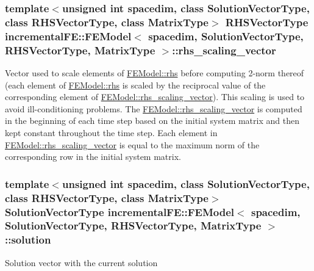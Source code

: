 \subsubsection[{\texorpdfstring{rhs\+\_\+scaling\+\_\+vector}{rhs_scaling_vector}}]{\setlength{\rightskip}{0pt plus 5cm}template$<$unsigned int spacedim, class Solution\+Vector\+Type, class R\+H\+S\+Vector\+Type, class Matrix\+Type$>$ R\+H\+S\+Vector\+Type {\bf incremental\+F\+E\+::\+F\+E\+Model}$<$ spacedim, Solution\+Vector\+Type, R\+H\+S\+Vector\+Type, Matrix\+Type $>$\+::rhs\+\_\+scaling\+\_\+vector\hspace{0.3cm}{\ttfamily [private]}}\hypertarget{classincremental_f_e_1_1_f_e_model_a26ffe7f5ecf94f3bdbe27f4ea3e577dc}{}\label{classincremental_f_e_1_1_f_e_model_a26ffe7f5ecf94f3bdbe27f4ea3e577dc}
Vector used to scale elements of \hyperlink{classincremental_f_e_1_1_f_e_model_aba8e9e925aa72d2dd0f86c451b2cf3d6}{F\+E\+Model\+::rhs} before computing 2-\/norm thereof (each element of \hyperlink{classincremental_f_e_1_1_f_e_model_aba8e9e925aa72d2dd0f86c451b2cf3d6}{F\+E\+Model\+::rhs} is scaled by the reciprocal value of the corresponding element of \hyperlink{classincremental_f_e_1_1_f_e_model_a26ffe7f5ecf94f3bdbe27f4ea3e577dc}{F\+E\+Model\+::rhs\+\_\+scaling\+\_\+vector}). This scaling is used to avoid ill-\/conditioning problems. The \hyperlink{classincremental_f_e_1_1_f_e_model_a26ffe7f5ecf94f3bdbe27f4ea3e577dc}{F\+E\+Model\+::rhs\+\_\+scaling\+\_\+vector} is computed in the beginning of each time step based on the initial system matrix and then kept constant throughout the time step. Each element in \hyperlink{classincremental_f_e_1_1_f_e_model_a26ffe7f5ecf94f3bdbe27f4ea3e577dc}{F\+E\+Model\+::rhs\+\_\+scaling\+\_\+vector} is equal to the maximum norm of the corresponding row in the initial system matrix. 
\subsubsection[{\texorpdfstring{solution}{solution}}]{\setlength{\rightskip}{0pt plus 5cm}template$<$unsigned int spacedim, class Solution\+Vector\+Type, class R\+H\+S\+Vector\+Type, class Matrix\+Type$>$ Solution\+Vector\+Type {\bf incremental\+F\+E\+::\+F\+E\+Model}$<$ spacedim, Solution\+Vector\+Type, R\+H\+S\+Vector\+Type, Matrix\+Type $>$\+::solution\hspace{0.3cm}{\ttfamily [private]}}\hypertarget{classincremental_f_e_1_1_f_e_model_a02134975db38fcf4f7ce698d605baa30}{}\label{classincremental_f_e_1_1_f_e_model_a02134975db38fcf4f7ce698d605baa30}
Solution vector with the current solution 
